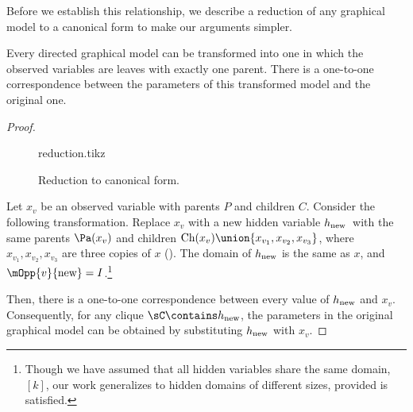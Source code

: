 
Before we establish this relationship,
we describe a reduction of any graphical model to
  a canonical form to make our arguments simpler.

\begin{lemma}
  \label{lem:reduction}
Every directed graphical model can be transformed into one in which
  the observed variables are leaves with exactly one parent. 
There is a one-to-one correspondence between the parameters of this
  transformed model and the original one.
\end{lemma}
\begin{proof}
  \begin{figure}
    \centering
    {reduction.tikz}
    \caption{Reduction to canonical form.}
    \label{fig:reduction}
  \end{figure}

  \providecommand{\hp}{\ensuremath{h_\text{\rm new}}}

  Let $x_v$ be an observed variable with parents $P$ and children $C$.
  Consider the following transformation.
  Replace $x_v$ with a new hidden variable \hp\ with the same
  parents $\Pa(x_v)$ and children $\text{Ch}(x_v) \union \{x_{v_1}, x_{v_2}, x_{v_3}\}$,
  where $x_{v_1},x_{v_2},x_{v_3}$ are three copies of $x$
  (). 
  The domain of $\hp$ is the same as $x$,
    and $\mOpp{v}{\textrm{new}} = I$.\footnote{
      Though we have assumed that all hidden variables share the
      same domain, $[k]$, our work generalizes to hidden domains of
      different sizes, provided  is satisfied.
      }

  Then, there is a one-to-one correspondence between every value of
  $\hp$ and $x_v$. Consequently, for any clique $\sC \contains \hp$, the
  parameters in the original graphical model can be obtained by
  substituting $\hp$ with $x_v$.
\end{proof}

